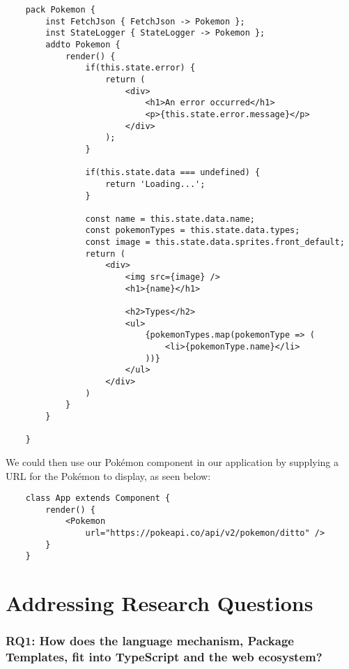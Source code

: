 \begin{verbatim}
    pack Pokemon {
        inst FetchJson { FetchJson -> Pokemon };
        inst StateLogger { StateLogger -> Pokemon };
        addto Pokemon {
            render() {
                if(this.state.error) {
                    return (
                        <div>
                            <h1>An error occurred</h1>
                            <p>{this.state.error.message}</p>
                        </div>
                    );
                }

                if(this.state.data === undefined) {
                    return 'Loading...';
                }

                const name = this.state.data.name;
                const pokemonTypes = this.state.data.types;
                const image = this.state.data.sprites.front_default;
                return (
                    <div>
                        <img src={image} />
                        <h1>{name}</h1>

                        <h2>Types</h2>
                        <ul>
                            {pokemonTypes.map(pokemonType => (
                                <li>{pokemonType.name}</li>
                            ))}
                        </ul>
                    </div>
                )
            }
        }

    }
\end{verbatim}

We could then use our Pokémon component in our application by supplying a URL for the Pokémon to display, as seen below:

\begin{verbatim}
    class App extends Component {
        render() {
            <Pokemon
                url="https://pokeapi.co/api/v2/pokemon/ditto" />
        }
    }
\end{verbatim}


\section{Addressing Research Questions}\label{sec:adressing-research-questions}


\subsubsection{RQ1: How does the language mechanism, Package Templates, fit into TypeScript and the web ecosystem?}

